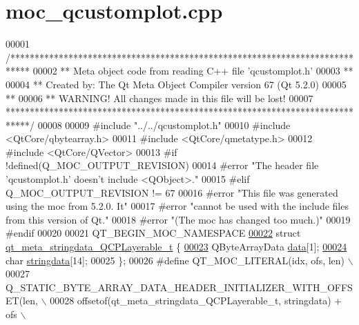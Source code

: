 \hypertarget{a00016_source}{\section{moc\+\_\+qcustomplot.\+cpp}
\label{a00016_source}
}

\begin{DoxyCode}
00001 \textcolor{comment}{/****************************************************************************}
00002 \textcolor{comment}{** Meta object code from reading C++ file 'qcustomplot.h'}
00003 \textcolor{comment}{**}
00004 \textcolor{comment}{** Created by: The Qt Meta Object Compiler version 67 (Qt 5.2.0)}
00005 \textcolor{comment}{**}
00006 \textcolor{comment}{** WARNING! All changes made in this file will be lost!}
00007 \textcolor{comment}{*****************************************************************************/}
00008 
00009 \textcolor{preprocessor}{#include "../../qcustomplot.h"}
00010 \textcolor{preprocessor}{#include <QtCore/qbytearray.h>}
00011 \textcolor{preprocessor}{#include <QtCore/qmetatype.h>}
00012 \textcolor{preprocessor}{#include <QtCore/QVector>}
00013 \textcolor{preprocessor}{#if !defined(Q\_MOC\_OUTPUT\_REVISION)}
00014 \textcolor{preprocessor}{#error "The header file 'qcustomplot.h' doesn't include <QObject>."}
00015 \textcolor{preprocessor}{#elif Q\_MOC\_OUTPUT\_REVISION != 67}
00016 \textcolor{preprocessor}{#error "This file was generated using the moc from 5.2.0. It"}
00017 \textcolor{preprocessor}{#error "cannot be used with the include files from this version of Qt."}
00018 \textcolor{preprocessor}{#error "(The moc has changed too much.)"}
00019 \textcolor{preprocessor}{#endif}
00020 
00021 QT\_BEGIN\_MOC\_NAMESPACE
\hypertarget{a00016_source_l00022}{}\hyperlink{a00016}{00022} \textcolor{keyword}{struct }\hyperlink{a00016_d8/d17/a00114}{qt\_meta\_stringdata\_QCPLayerable\_t} \{
\hypertarget{a00016_source_l00023}{}\hyperlink{a00016_a08a4a1de23442a83952a11d68453ab4d}{00023}     QByteArrayData \hyperlink{a00016_a08a4a1de23442a83952a11d68453ab4d}{data}[1];
\hypertarget{a00016_source_l00024}{}\hyperlink{a00016_a4dff397c178a0aa24e1087e6ab89c187}{00024}     \textcolor{keywordtype}{char} \hyperlink{a00016_a4dff397c178a0aa24e1087e6ab89c187}{stringdata}[14];
00025 \};
00026 \textcolor{preprocessor}{#define QT\_MOC\_LITERAL(idx, ofs, len) \(\backslash\)}
00027 \textcolor{preprocessor}{    Q\_STATIC\_BYTE\_ARRAY\_DATA\_HEADER\_INITIALIZER\_WITH\_OFFSET(len, \(\backslash\)}
00028 \textcolor{preprocessor}{    offsetof(qt\_meta\_stringdata\_QCPLayerable\_t, stringdata) + ofs \(\backslash\)}

\end{DoxyCode}
